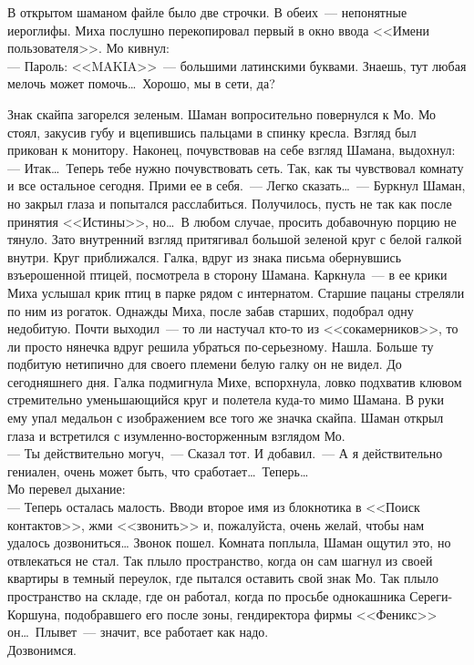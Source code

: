 В открытом шаманом файле было две строчки. В обеих~--- непонятные иероглифы. 
Миха послушно перекопировал первый в окно ввода <<Имени пользователя>>. Мо кивнул:\\
--- Пароль: <<MAKIA>>~--- большими латинскими буквами. Знаешь, тут любая мелочь 
может помочь\ldots\ Хорошо, мы в сети, да? 

Знак скайпа загорелся зеленым. Шаман вопросительно повернулся к Мо. Мо стоял, 
закусив губу и вцепившись пальцами в спинку кресла. Взгляд был прикован к 
монитору. Наконец, почувствовав на себе взгляд Шамана, выдохнул:\\
--- Итак\ldots\ Теперь тебе нужно почувствовать сеть. Так, как ты чувствовал 
комнату и 
все остальное сегодня. Прими ее в себя.~--- Легко сказать\ldots~--- Буркнул 
Шаман, но 
закрыл глаза и попытался расслабиться. Получилось, пусть не так как после 
принятия <<Истины>>, но\ldots\ В любом случае, просить добавочную порцию не 
тянуло. 
Зато внутренний взгляд притягивал большой зеленой круг с белой галкой внутри. 
Круг приближался. Галка, вдруг из знака письма обернувшись взъерошенной птицей, 
посмотрела в сторону Шамана. Каркнула~--- в ее крики Миха услышал крик птиц в 
парке рядом с интернатом. Старшие пацаны стреляли по ним из рогаток. Однажды 
Миха, после забав старших, подобрал одну недобитую. Почти выходил~--- то ли 
настучал кто-то из <<сокамерников>>, то ли просто нянечка вдруг решила убраться 
по-серьезному. Нашла. Больше ту подбитую нетипично для своего племени белую 
галку он не видел. До сегодняшнего дня. Галка подмигнула Михе, вспорхнула, 
ловко подхватив клювом стремительно уменьшающийся круг и полетела куда-то мимо 
Шамана. В руки ему упал медальон с изображением все того же значка скайпа. Шаман открыл 
глаза и встретился с изумленно-восторженным взглядом Мо.\\
--- Ты действительно могуч,~--- Сказал тот. И добавил.~--- А я действительно 
гениален, очень может быть, что сработает\ldots\ Теперь\ldots\\ 
Мо перевел дыхание:\\
--- Теперь осталась малость. Вводи второе имя из блокнотика в <<Поиск 
контактов>>, жми <<звонить>> и, пожалуйста, очень желай, чтобы нам удалось дозвониться\ldots
Звонок пошел. Комната поплыла, Шаман ощутил это, но отвлекаться не стал. Так 
плыло пространство, когда он сам шагнул из своей квартиры в темный переулок, 
где пытался оставить свой знак Мо. Так плыло пространство на складе, где он 
работал, когда по просьбе однокашника Сереги-Коршуна, подобравшего его после зоны, 
гендиректора фирмы <<Феникс>> он\ldots\ Плывет~--- значит, все работает как 
надо.\\
Дозвонимся.\\

